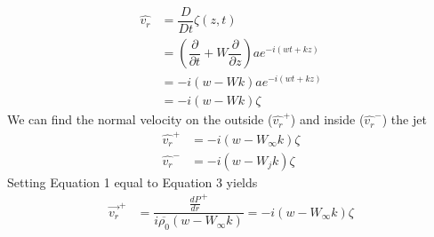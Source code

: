 \documentclass[onecolumn,10pt]{jhwhw}
\begin{document}
\begin{align*}
\hat{v_r} &= \dfrac{D }{D t} \zeta(z, t) \\
&= \left( \dfrac{\partial}{\partial t} + W \dfrac{\partial}{\partial z} \right) a e^{-i (w t + k z)} \\
&= -i \left( w - W k \right) a e^{-i (w t + k z)} \\
&= -i \left( w - W k \right) \zeta
\end{align*}
We can find the normal velocity on the outside ($\hat{v_r}^+$) and inside ($\hat{v_r}^-$) the jet
\begin{align}
\hat{v_r}^+ &= -i \left( w - W_{\infty} k \right) \zeta \\
\hat{v_r}^- &= -i \left( w - W_{j} k \right) \zeta
\end{align}
Setting Equation 1 equal to Equation 3 yields
\begin{align*}
\vec{v_r}^+ &= \dfrac{\frac{d P}{d r}^+} {i \overline{\rho_0} \left(w - W_{\infty}k \right) } = -i \left( w - W_{\infty} k \right) \zeta
\end{align*}
\end{document}
